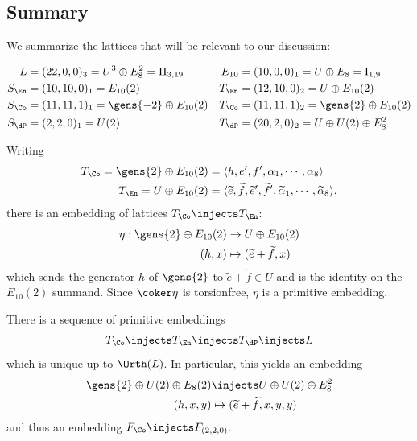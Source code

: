 \documentclass[../main.tex]{subfiles}
\begin{document}
\subsection{Summary}
We summarize the lattices that will be relevant to our discussion:

\begin{align*}
    L &= (22, 0, 0)_3 = U^3 \oplus E_8^2 = \rm{II}_{3, 19} &
    E_{10} &= (10, 0, 0)_1 = U \oplus E_8 = \mathrm{I}_{1, 9} \\
    S_\En &= (10, 10, 0)_1 = E_{10}(2) & 
    T_\En &= (12, 10, 0)_2 = U \oplus E_{10}(2) \\
    S_\Co &= (11, 11, 1)_1 = \gens{-2} \oplus E_{10}(2) & 
    T_\Co &= (11,11,1)_2 = \gens{2} \oplus E_{10}(2) \\
    S_{\dP} &= (2,2,0)_1 = U(2) &
    T_{\dP} &= (20, 2, 0)_2 = U \oplus U(2) \oplus E_8^2
\end{align*}

\begin{lemma}\label{lem:primitive_embedding_eta}
Writing
\begin{align*}
T_\Co = \gens{2} \oplus E_{10}(2) &= \langle h, e', f',\alpha_1,\cdots, \alpha_8 \rangle \\
T_\En = U \oplus E_{10}(2) &= \langle \tilde e,\tilde f,\tilde e',\tilde f',\tilde \alpha_1,\cdots,\tilde \alpha_8\rangle,
\end{align*}
there is an embedding of lattices $T_\Co \injects T_\En$:
\begin{align*}
    \eta: \gens{2} \oplus E_{10}(2) &\to U \oplus E_{10}(2) \\
    (h, x) &\mapsto (\tilde e + \tilde f, x)
\end{align*}
which sends the generator $h$ of $\gens{2}$ to $\tilde e+\tilde f\in U$ and is the identity on the $E_{10}(2)$ summand. Since $\coker \eta$ is torsionfree, $\eta$ is a primitive embedding.
\end{lemma}

\begin{lemma}\label{lem:sequence_of_embeddings}
There is a sequence of primitive embeddings
\[
T_{\Co} \injects T_{\En} \injects T_{\dP} \injects L
\]
which is unique up to $\Orth(L)$. In particular, this yields an embedding
\begin{align*}
    \gens{2} \oplus U(2) \oplus E_8(2) &\injects U \oplus U(2) \oplus E_8^2 \\
    (h,x,y) & \mapsto (\tilde e + \tilde f, x, y, y)
\end{align*}
and thus an embedding $F_{\Co} \injects F_{(2,2,0)}$.
\end{lemma}
\end{document}
